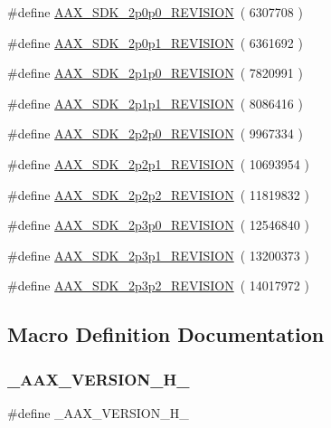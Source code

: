 \begin{DoxyCompactItemize}
\item 
\#define \mbox{\hyperlink{a00707_a6812efd6aa67be81303111a96a198f8f}{A\+A\+X\+\_\+\+S\+D\+K\+\_\+2p0p0\+\_\+\+R\+E\+V\+I\+S\+I\+ON}}~( 6307708 )
\item 
\#define \mbox{\hyperlink{a00707_a3767dbdbc177e52acb0f40538d97fa62}{A\+A\+X\+\_\+\+S\+D\+K\+\_\+2p0p1\+\_\+\+R\+E\+V\+I\+S\+I\+ON}}~( 6361692 )
\item 
\#define \mbox{\hyperlink{a00707_a5437de433f71ac4e532af9f5c92304d3}{A\+A\+X\+\_\+\+S\+D\+K\+\_\+2p1p0\+\_\+\+R\+E\+V\+I\+S\+I\+ON}}~( 7820991 )
\item 
\#define \mbox{\hyperlink{a00707_a53c6643ef3a6e56f9cd1123450edd167}{A\+A\+X\+\_\+\+S\+D\+K\+\_\+2p1p1\+\_\+\+R\+E\+V\+I\+S\+I\+ON}}~( 8086416 )
\item 
\#define \mbox{\hyperlink{a00707_a3eb1986d2b098fe43668950ed3316a19}{A\+A\+X\+\_\+\+S\+D\+K\+\_\+2p2p0\+\_\+\+R\+E\+V\+I\+S\+I\+ON}}~( 9967334 )
\item 
\#define \mbox{\hyperlink{a00707_a83e27e34a803732c8ec1293ce73c3406}{A\+A\+X\+\_\+\+S\+D\+K\+\_\+2p2p1\+\_\+\+R\+E\+V\+I\+S\+I\+ON}}~( 10693954 )
\item 
\#define \mbox{\hyperlink{a00707_ac68aa5c59e0bdaf842970dc0c770b2da}{A\+A\+X\+\_\+\+S\+D\+K\+\_\+2p2p2\+\_\+\+R\+E\+V\+I\+S\+I\+ON}}~( 11819832 )
\item 
\#define \mbox{\hyperlink{a00707_ae723e68321a5eefbd89cac5c4bae6009}{A\+A\+X\+\_\+\+S\+D\+K\+\_\+2p3p0\+\_\+\+R\+E\+V\+I\+S\+I\+ON}}~( 12546840 )
\item 
\#define \mbox{\hyperlink{a00707_a3a4ccb5c34d6cdbb0cf55945bec952b7}{A\+A\+X\+\_\+\+S\+D\+K\+\_\+2p3p1\+\_\+\+R\+E\+V\+I\+S\+I\+ON}}~( 13200373 )
\item 
\#define \mbox{\hyperlink{a00707_a8ef2556f2012952023b601e1024b0745}{A\+A\+X\+\_\+\+S\+D\+K\+\_\+2p3p2\+\_\+\+R\+E\+V\+I\+S\+I\+ON}}~( 14017972 )
\end{DoxyCompactItemize}


\subsection{Macro Definition Documentation}
\mbox{\label{a00707_aa2233aa6f57ff48373eddf8aeda68919}} 
\subsubsection{\texorpdfstring{\_AAX\_VERSION\_H\_}{\_AAX\_VERSION\_H\_}}
{\footnotesize\ttfamily \#define \+\_\+\+A\+A\+X\+\_\+\+V\+E\+R\+S\+I\+O\+N\+\_\+\+H\+\_\+}

